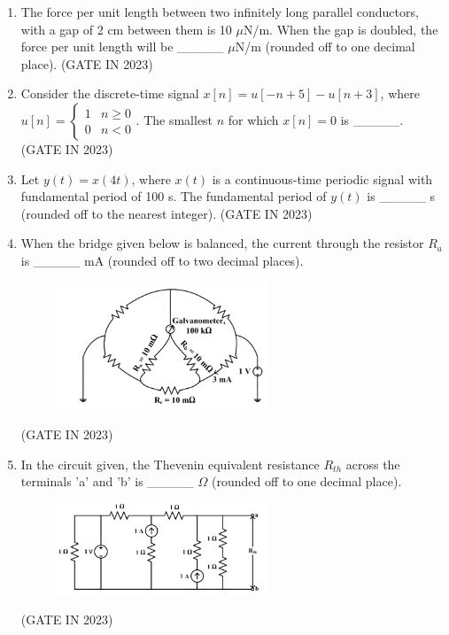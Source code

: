 \documentclass[journal]{IEEEtran}
\begin{document}
\begin{enumerate}
    \item The force per unit length between two infinitely long parallel conductors, with a gap of 2 cm between them is 10 $\mu$N/m. When the gap is doubled, the force per unit length will be \_\_\_\_\_ $\mu$N/m (rounded off to one decimal place).
\hfill(GATE IN 2023)

    \item Consider the discrete-time signal $x[n] = u[-n + 5] - u[n + 3]$, where $u[n] = \begin{cases} 1 & n \geq 0 \\ 0 & n < 0 \end{cases}$. The smallest $n$ for which $x[n] = 0$ is \_\_\_\_\_.
\hfill(GATE IN 2023)

    \item Let $y(t) = x(4t)$, where $x(t)$ is a continuous-time periodic signal with fundamental period of 100 s. The fundamental period of $y(t)$ is \_\_\_\_\_ s (rounded off to the nearest integer).
\hfill(GATE IN 2023)

    \item When the bridge given below is balanced, the current through the resistor $R_a$ is \_\_\_\_\_ mA (rounded off to two decimal places).
    \begin{figure}[H]
    \centering
      \includegraphics[width=0.6\textwidth]{16.png} 
      \caption{}
    \label{fig:fig16} 
\end{figure}
\hfill(GATE IN 2023)

    \item In the circuit given, the Thevenin equivalent resistance $R_{th}$ across the terminals 'a' and 'b' is \_\_\_\_\_ $\Omega$ (rounded off to one decimal place).
    \begin{figure}[H]
    \centering
      \includegraphics[width=0.6\textwidth]{17.png} 
      \caption{}
    \label{fig:fig17} 
\end{figure}
\hfill(GATE IN 2023)


\end{enumerate}
\end{document}
